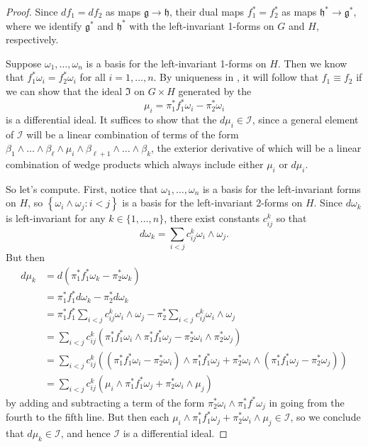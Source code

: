 \begin{proof}
	Since $df_1 = df_2$ as maps $ \mathfrak{g} \to \mathfrak{h}$, their dual maps $f_1^\ast = f_2^\ast$ as maps $\mathfrak{h}^\ast \to \mathfrak{g}^\ast$, where we identify $\mathfrak{g}^\ast$ and $\mathfrak{h}^\ast$ with the left-invariant 1-forms on $G$ and $H$, respectively.
	
	Suppose $\omega_1, \dots , \omega_n$ is a basis for the left-invariant 1-forms on $H$. Then we know that $f_1^\ast \omega_i = f_2^\ast \omega_i$ for all $i=1, \dots , n$. By uniqueness in , it will follow that $f_1 \equiv f_2$ if we can show that the ideal $\mathfrak{I}$ on $G \times H$ generated by the
	\[
		\mu_i = \pi_1^\ast f_1^\ast \omega_i - \pi_2^\ast \omega_i
	\]
	is a differential ideal. It suffices to show that the $d\mu_i \in \mathcal{I}$, since a general element of $\mathcal{I}$ will be a linear combination of terms of the form $\beta_1 \wedge \dots \wedge \beta_\ell \wedge \mu_i \wedge \beta_{\ell+1} \wedge \dots \wedge \beta_k$, the exterior derivative of which will be a linear combination of wedge products which always include either $\mu_i$ or $d\mu_i$.
	
	So let's compute. First, notice that $\omega_1, \dots , \omega_n$ is a basis for the left-invariant forms on $H$, so $\left\{\omega_i \wedge \omega_j : i < j \right\}$ is a basis for the left-invariant 2-forms on $H$. Since $d\omega_k$ is left-invariant for any $k \in \{1, \dots, n\}$, there exist constants $c_{ij}^k$ so that
	\[
		d\omega_k = \sum_{i < j} c_{ij}^k \omega_i \wedge \omega_j.
	\]
	But then
	\begin{align*}
		d\mu_k & = d\left(\pi_1^\ast f_1^\ast \omega_k - \pi_2^\ast \omega_k\right) \\
		& = \pi_1^\ast f_1^\ast d\omega_k - \pi_2^\ast d\omega_k \\
		& = \pi_1^\ast f_1^\ast \sum_{i < j} c_{ij}^k \omega_i \wedge \omega_j - \pi_2^\ast \sum_{i < j} c_{ij}^k \omega_i \wedge \omega_j \\
		& = \sum_{i<j} c_{ij}^k \left( \pi_1^\ast f_1^\ast \omega_i \wedge \pi_1^\ast f_1^\ast \omega_j - \pi_2^\ast \omega_i \wedge \pi_2^\ast\omega_j\right) \\
		& =  \sum_{i<j} c_{ij}^k \left( \left(\pi_1^\ast f_1^\ast \omega_i -\pi_2^\ast \omega_i \right)\wedge \pi_1^\ast f_1^\ast \omega_j + \pi_2^\ast \omega_i \wedge \left(\pi_1^\ast f_1^\ast \omega_j - \pi_2^\ast \omega_j \right)\right) \\
		& =  \sum_{i<j} c_{ij}^k \left( \mu_i\wedge \pi_1^\ast f_1^\ast \omega_j + \pi_2^\ast \omega_i \wedge \mu_j\right) 
	\end{align*}
	by adding and subtracting a term of the form $\pi_2^\ast \omega_i \wedge \pi_1^\ast f^\ast \omega_j$ in going from the fourth to the fifth line. But then each $ \mu_i\wedge \pi_1^\ast f_1^\ast \omega_j + \pi_2^\ast \omega_i \wedge \mu_j \in \mathcal{I}$, so we conclude that $d\mu_k \in \mathcal{I}$, and hence $\mathcal{I}$ is a differential ideal.
\end{proof}

